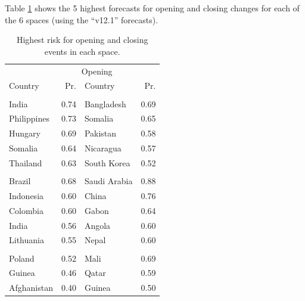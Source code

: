 \documentclass[
  11pt,
]{article}
\begin{document}
Table \ref{tab:topN} shows the 5 highest forecasts for opening and
closing changes for each of the 6 spaces (using the ``v12.1''
forecasts).

\begin{table}

\caption{\label{tab:topN}Highest risk for opening and closing events in each space.}
\centering
\begin{tabular}[t]{>{\raggedright\arraybackslash}p{12em}r>{\raggedright\arraybackslash}p{10em}r}
\toprule
\multicolumn{2}{c}{Closing} & \multicolumn{2}{c}{Opening} \\
\cmidrule(l{3pt}r{3pt}){1-2} \cmidrule(l{3pt}r{3pt}){3-4}
Country & Pr. & Country & Pr.\\
\midrule
\addlinespace[0.3em]
\multicolumn{4}{l}{\textbf{Associational}}\\
\hspace{1em}India & 0.74 & Bangladesh & 0.69\\
\hspace{1em}Philippines & 0.73 & Somalia & 0.65\\
\hspace{1em}Hungary & 0.69 & Pakistan & 0.58\\
\hspace{1em}Somalia & 0.64 & Nicaragua & 0.57\\
\hspace{1em}Thailand & 0.63 & South Korea & 0.52\\
\addlinespace[0.3em]
\multicolumn{4}{l}{\textbf{Economic}}\\
\hspace{1em}Brazil & 0.68 & Saudi Arabia & 0.88\\
\hspace{1em}Indonesia & 0.60 & China & 0.76\\
\hspace{1em}Colombia & 0.60 & Gabon & 0.64\\
\hspace{1em}India & 0.56 & Angola & 0.60\\
\hspace{1em}Lithuania & 0.55 & Nepal & 0.60\\
\addlinespace[0.3em]
\multicolumn{4}{l}{\textbf{Electoral}}\\
\hspace{1em}Poland & 0.52 & Mali & 0.69\\
\hspace{1em}Guinea & 0.46 & Qatar & 0.59\\
\hspace{1em}Afghanistan & 0.40 & Guinea & 0.50\\

\end{tabular}
\end{table}
\end{document}
